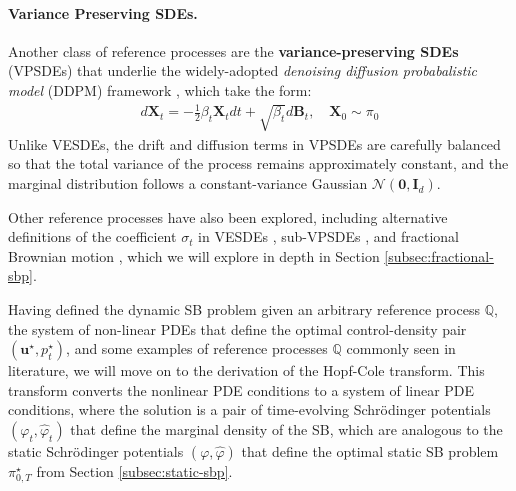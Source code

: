 \documentclass{article}
\begin{document}
{\paragraph{Variance Preserving SDEs.} Another class of reference processes are the \textbf{variance-preserving SDEs} (VPSDEs) that underlie the widely-adopted \textit{denoising diffusion probabalistic model} (DDPM) framework \citep{ho2020denoising, sohl2015deep, song2020score}, which take the form:
\begin{align}
    d\boldsymbol{X}_t=-\frac{1}{2}\beta_t\boldsymbol{X}_tdt+\sqrt{\beta_t}d\boldsymbol{B}_t, \quad \boldsymbol{X}_0\sim \pi_0 \tag{Variance Preserving SDE}
\end{align}
Unlike VESDEs, the drift and diffusion terms in VPSDEs are carefully balanced so that the total variance of the process remains approximately constant, and the marginal distribution follows a constant-variance Gaussian $\mathcal{N}(\boldsymbol{0}, \boldsymbol{I}_d)$.

Other reference processes have also been explored, including alternative definitions of the coefficient $\sigma_t$ in VESDEs \citep{karras2022elucidating, song2023consistency}, sub-VPSDEs \citep{song2020score}, and fractional Brownian motion \citep{nobis2025fractional}, which we will explore in depth in Section \ref{subsec:fractional-sbp}.
}

Having defined the dynamic SB problem given an arbitrary reference process $\mathbb{Q}$, the system of non-linear PDEs that define the optimal control-density pair $(\boldsymbol{u}^\star, p_t^\star)$, and some examples of reference processes $\mathbb{Q}$ commonly seen in literature, we will move on to the derivation of the Hopf-Cole transform. This transform converts the nonlinear PDE conditions to a system of linear PDE conditions, where the solution is a pair of time-evolving Schrödinger potentials $(\varphi_t, \hat\varphi_t)$ that define the marginal density of the SB, which are analogous to the static Schrödinger potentials $(\varphi, \hat\varphi)$ that define the optimal static SB problem $\pi^\star_{0,T}$ from Section \ref{subsec:static-sbp}.
\end{document}
